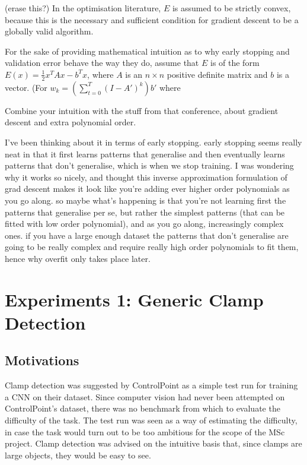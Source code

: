 \documentclass[a4paper,11pt]{article}
\begin{document}
(erase this?) In the optimisation literature, $E$ is assumed to be strictly convex, because this is the necessary and sufficient condition for gradient descent to be a globally valid algorithm. 

For the sake of providing mathematical intuition as to why early stopping and validation error behave the way they do, assume that $E$ is of the form $E(x) = \frac{1}{2}x^T Ax - b^T x$, where $A$ is an $n \times n$ positive definite matrix and $b$ is a vector. (For 
$ w_k = ( \sum_{t=0}^{T} (I - A')^k)b'$ where 


Combine your intuition with the stuff from that conference, about gradient descent and extra polynomial order.

I've been thinking about it in terms of early stopping. early stopping seems really neat in that it first learns patterns that generalise and then eventually learns patterns that don't generalise, which is when we stop training. I was wondering why  it works so nicely, and thought this inverse approximation formulation of grad descent makes it look like you're adding ever higher order polynomials as you go along. so maybe what's happening is that you're not learning first the patterns that generalise per se, but rather the simplest patterns (that can be fitted with low order polynomial), and as you go along, increasingly complex ones. if you have a large enough dataset the patterns that don't generalise are going to be really complex and require really high order polynomials to fit them, hence why overfit only takes place later.

\clearpage

\section{Experiments 1: Generic Clamp Detection}

\subsection{Motivations}

Clamp detection was suggested by ControlPoint as a simple test run for training a CNN on their dataset. Since computer vision had never been attempted on ControlPoint's dataset, there was no benchmark from which to evaluate the difficulty of the task. The test run was seen as a way of estimating the difficulty, in case the task would turn out to be too ambitious for the scope of the MSc project. Clamp detection was advised on the intuitive basis that, since clamps are large objects, they would be easy to see. 
\end{document}
